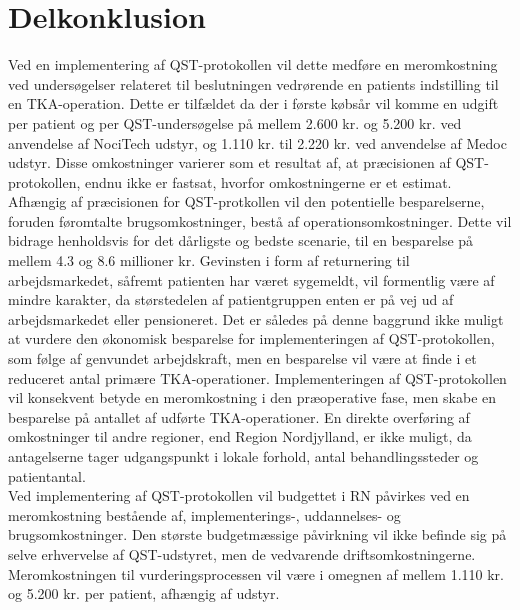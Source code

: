 \section{Delkonklusion}
Ved en implementering af QST-protokollen vil dette medføre en meromkostning ved undersøgelser relateret til beslutningen vedrørende en patients indstilling til en TKA-operation. Dette er tilfældet da der i første købsår vil komme en udgift per patient og per QST-undersøgelse på mellem 2.600 kr. og 5.200 kr. ved anvendelse af NociTech udstyr, og 1.110 kr. til 2.220 kr. ved anvendelse af Medoc udstyr. Disse omkostninger varierer som et resultat af, at præcisionen af QST-protokollen, endnu ikke er fastsat, hvorfor omkostningerne er et estimat. Afhængig af præcisionen for QST-protkollen vil den potentielle besparelserne, foruden føromtalte brugsomkostninger, bestå af operationsomkostninger. Dette vil bidrage henholdsvis for det dårligste og bedste scenarie, til en besparelse på mellem 4.3 og 8.6 millioner kr. Gevinsten i form af returnering til arbejdsmarkedet, såfremt patienten har været sygemeldt, vil formentlig være af mindre karakter, da størstedelen af patientgruppen enten er på vej ud af arbejdsmarkedet eller pensioneret. Det er således på denne baggrund ikke muligt at vurdere den økonomisk besparelse for implementeringen af QST-protokollen, som følge af genvundet arbejdskraft, men en besparelse vil være at finde i et reduceret antal primære TKA-operationer. Implementeringen af QST-protokollen vil konsekvent betyde en meromkostning i den præoperative fase, men skabe en besparelse på antallet af udførte TKA-operationer. En direkte overføring af omkostninger til andre regioner, end Region Nordjylland, er ikke muligt, da antagelserne tager udgangspunkt i lokale forhold, antal behandlingssteder og patientantal. \\
Ved implementering af QST-protokollen vil budgettet i RN påvirkes ved en meromkostning bestående af, implementerings-, uddannelses- og brugsomkostninger. Den største budgetmæssige påvirkning vil ikke befinde sig på selve erhvervelse af QST-udstyret, men de vedvarende driftsomkostningerne. Meromkostningen til vurderingsprocessen vil være i omegnen af mellem 1.110 kr. og 5.200 kr. per patient, afhængig af udstyr. 